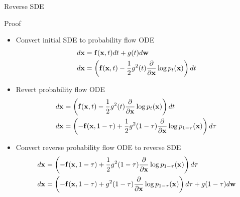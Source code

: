 \begin{frame}{Reverse SDE}
	\begin{block}{Proof}
		\begin{itemize}
			\item Convert initial SDE to probability flow ODE
			\vspace{-0.1cm}
			{\footnotesize
			\begin{align*}
				d\mathbf{x} &= \mathbf{f}(\mathbf{x}, t) dt + g(t) d \mathbf{w} \\
				d\mathbf{x} &= \left(\mathbf{f}(\mathbf{x}, t) -\frac{1}{2} g^2(t) \frac{\partial}{\partial \mathbf{x}} \log p_t(\mathbf{x}) \right) dt
			\end{align*}
			}
			\item Revert probability flow ODE
			\vspace{-0.1cm}
			{\footnotesize
			\begin{align*}
				d\mathbf{x} &= \left(\mathbf{f}(\mathbf{x}, t) -\frac{1}{2} g^2(t) \frac{\partial}{\partial \mathbf{x}} \log p_t(\mathbf{x}) \right) dt \\
				d\mathbf{x} &= \left(- \mathbf{f}(\mathbf{x}, 1 - \tau) + \frac{1}{2} g^2(1 - \tau) \frac{\partial}{\partial \mathbf{x}} \log p_{1 - \tau}(\mathbf{x}) \right) d \tau
			\end{align*}
			}
			\item Convert reverse probability flow ODE to reverse SDE
			\vspace{-0.1cm}
			{\footnotesize
			\begin{align*}
				d\mathbf{x} &= \left(- \mathbf{f}(\mathbf{x}, 1 - \tau) + \frac{1}{2} g^2(1 - \tau) \frac{\partial}{\partial \mathbf{x}} \log p_{1 - \tau}(\mathbf{x}) \right) d \tau \\
				d\mathbf{x} &= \left(- \mathbf{f}(\mathbf{x}, 1 - \tau) + g^2(1 - \tau) \frac{\partial}{\partial \mathbf{x}} \log p_{1 - \tau}(\mathbf{x}) \right) d\tau + g(1 - \tau) d \mathbf{w}
			\end{align*}
			}
		\end{itemize}
	\end{block}
\end{frame}
